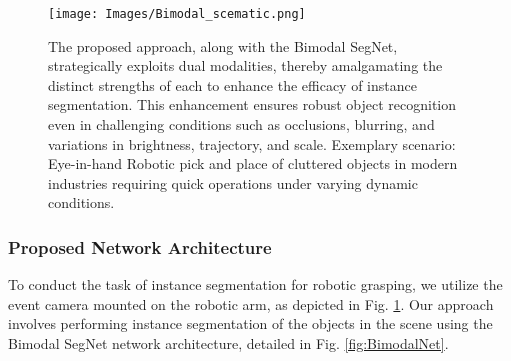 \documentclass[lettersize,journal]{IEEEtran}
\begin{document}
\begin{figure}[h!]
      \centering
\texttt{[image: Images/Bimodal\_scematic.png]}
\caption{The proposed approach, along with the Bimodal SegNet, strategically exploits dual modalities, thereby amalgamating the distinct strengths of each to enhance the efficacy of instance segmentation. This enhancement ensures robust object recognition even in challenging conditions such as occlusions, blurring, and variations in brightness, trajectory, and scale. Exemplary scenario: Eye-in-hand Robotic pick and place of cluttered objects in modern industries requiring quick operations under varying dynamic conditions.}
\label{fig: Overview BimodalNet with arm}
\end{figure}



\begin{figure*}[h!]
\caption{\footnotesize
{ The proposed Bimodal SegNet architecture uses event-based vision sensors such as DAVIS346 to produce both asynchronous events and RGB frames. These data are passed into Event Synchronisation and RGB encoders respectively. The convoluted blocks within these encoders downscale the input for multiple times to infer feature maps. At each downscaling stage, a CDCA layer is used, which inputs into the APFA block. The features for each sampling rate in the APFA block are then fused and sent to the decoder block. Here, the image is upscaled multiple times. The process uses a combination of up-convolution, copy and crop, and convolution with Relu, ultimately retrieving the original spatial dimension of the input image. The final fused tensor comes from the output of the CDCA module and the previous decoder layer. } }
\label{fig:BimodalNet}
\end{figure*}







\subsubsection{\textbf{Proposed Network Architecture}}
\label{subsubsection : Proposed Network Architecture}




To conduct the task of instance segmentation for robotic grasping, we utilize the event camera mounted on the robotic arm, as depicted in Fig. \ref{fig: Overview BimodalNet with arm}. Our approach involves performing instance segmentation of the objects in the scene using the Bimodal SegNet network architecture, detailed in Fig. \ref{fig:BimodalNet}.
\end{document}
